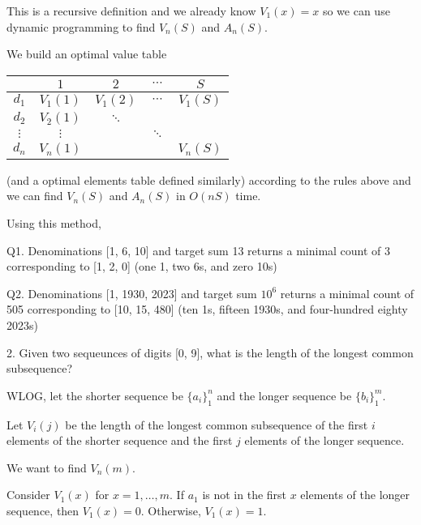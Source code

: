 \documentclass[12pt]{article}
\newenvironment*{proof}[1][blue]{
    \begin{tcolorbox}[
        parbox=false,
        colback=#1!5!white,
        colframe=#1!75!black,
        coltext=#1,
        breakable
    ]}
    {\end{tcolorbox}}
\begin{document}
        This is a recursive definition and we already know $V_1(x) = x$ so we can use dynamic programming to find $V_n(S)$ and $A_n(S)$.

        We build an optimal value table 

        \begin{center}
            \begin{tabular}{|c|cccc|}
                \hline
                & $1$ & $2$ & $\cdots$ & $S$ \\
                \hline
                $d_1$ & $V_1(1)$ & $V_1(2) $ & $\cdots$ & $V_1(S)$ \\
                $d_2$ & $V_2(1)$ & $\ddots$ & &\\
                $\vdots$ & $\vdots$ & & $\ddots$ &\\ 
                $d_n$ & $V_n(1)$ & & & $V_n(S)$ \\
                \hline
            \end{tabular}
        \end{center}
        
        (and a optimal elements table defined similarly) according to the rules above and we can find $V_n(S)$ and $A_n(S)$ in $O(nS)$ time.

        Using this method, 

        \begin{proof}
            Q1. Denominations [1, 6, 10] and target sum 13 returns a minimal count of 3 corresponding to [1, 2, 0] (one 1, two 6s, and zero 10s)

            Q2. Denominations [1, 1930, 2023] and target sum $10^6$ returns a minimal count of 505 corresponding to [10, 15, 480] (ten 1s, fifteen 1930s, and four-hundred eighty 2023s)
        \end{proof}
    \color{black}

    \pagebreak 

    2. Given two sequeunces of digits [0, 9], what is the length of the longest common subsequence?

    \color{blue}
        WLOG, let the shorter sequence be $\{a_i\}_1^n$ and the longer sequence be $\{b_i\}_1^m$. 

        Let $V_i(j)$ be the length of the longest common subsequence of the first $i$ elements of the shorter sequence and the first $j$ elements of the longer sequence.

        We want to find $V_n(m)$.

        Consider $V_1(x)$ for $x = 1, \dots, m$. If $a_1$ is not in the first $x$ elements of the longer sequence, then $V_1(x) = 0$. Otherwise, $V_1(x) = 1$.
        
\end{document}
